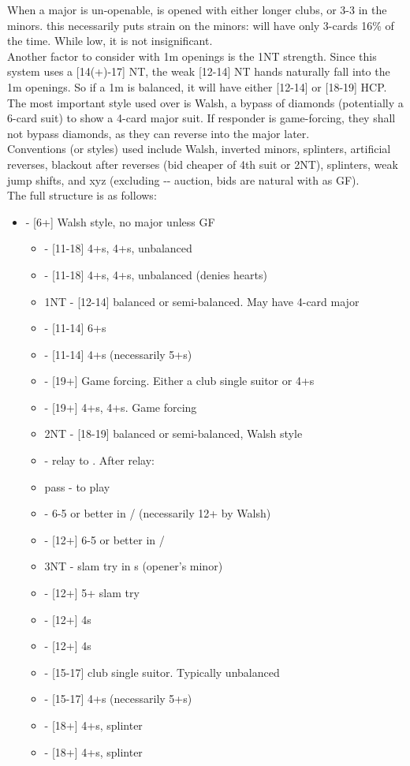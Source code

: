 \documentclass[12pt]{report}
\newcommand{\n}{\\}
\newcommand{\q}[1]{\multido{}{#1}{\qquad}}
\newcommand{\ul}[1]{\begin{itemize}#1\end{itemize}}
\newcommand{\li}[1]{\item[~] \q{#1}}
\begin{document}
\begin{center}

    When a major is un-openable,  is opened with either longer clubs, or 3-3 in the minors. this necessarily puts strain on the minors:  will have only 3-cards 16\% of the time.  While low, it is not insignificant.\n
    
    Another factor to consider with 1m openings is the 1NT strength.  Since this system uses a [14(+)-17] NT, the weak [12-14] NT hands naturally fall into the 1m openings.  So if a 1m is balanced, it will have either [12-14] or [18-19] HCP.\n

    The most important style used over  is Walsh, a bypass of diamonds (potentially a 6-card suit) to show a 4-card major suit.  If responder is game-forcing, they shall not bypass diamonds, as they can reverse into the major later.\n

    Conventions (or styles) used include Walsh, inverted minors, splinters, artificial reverses, blackout after reverses (bid cheaper of 4th suit or 2NT), splinters, weak jump shifts, and xyz (excluding -- auction, bids are natural with  as GF). \n

    The full structure is as follows:

    \ul{
        \li0  - [6+] Walsh style, no major unless GF \ul{
            \li0 \he1 - [11-18] 4+\cl{}s, 4+\he{}s, unbalanced
            \li0 \sp1 - [11-18] 4+\cl{}s, 4+\sp{}s, unbalanced (denies hearts)
            \li0 1NT - [12-14] balanced or semi-balanced.  May have 4-card major
            \li0 \cl2 - [11-14] 6+\cl{}s
            \li0 \di2 - [11-14] 4+\di{}s (necessarily 5+\cl{}s)
            \li0 \he2 - [19+] Game forcing.  Either a club single suitor or 4+\he{}s
            \li0 \sp2 - [19+] 4+\cl{}s, 4+\sp{}s.  Game forcing
            \li0 2NT - [18-19] balanced or semi-balanced, Walsh style 
                \li1 \cl3 - relay to \di{3}.  After relay: 
                    \li2 pass - to play
                    \li2 \he3 - 6-5 or better in \di{}/\he{} (necessarily 12+ by Walsh)
                    \li2 \sp3 - [12+] 6-5 or better in \di{}/\sp{}
                    \li2 3NT - slam try in \cl{}s (opener's minor) 
                \li1 \di3 - [12+] 5+ slam try
                \li1 \he3 - [12+] 4\he{}s
                \li1 \sp3 - [12+] 4\sp{}s 
            \li0 \cl3 - [15-17] club single suitor.  Typically unbalanced
            \li0 \di3 - [15-17] 4+\di{}s (necessarily 5+\cl{}s)
            \li0 \he3 - [18+] 4+\di{}s, splinter
            \li0 \sp3 - [18+] 4+\di{}s, splinter
        }

}
\end{center}
\end{document}
